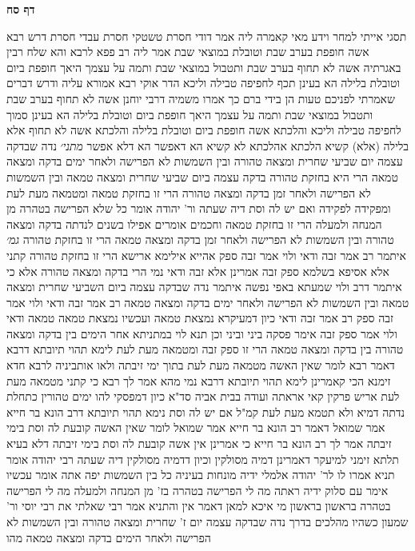 \documentclass[12pt, openany]{book}
\newcommand{\sethebfont}{
\fontsize{10.5pt}{21.0pt} \selectfont
}
\newcommand{\twocol}[1]{
	{\sethebfont \begin{multicols}{2}
			#1
	\end{multicols}}	
}
\newcommand{\sectname}{}
\newcommand{\newsection}[1]{
	\addcontentsline{toc}{section}{#1}
	\renewcommand{\sectname}{#1}	
	\vspace{-\baselineskip}
	\begin{center}
		\textbf{%
\fontsize{16pt}{16pt}\selectfont
			#1}
	\end{center}
	\vspace{-\baselineskip}
	\nopagebreak
}
\begin{document}
\newsection{דף סח}
\twocol{תסגי אייתי למחר  וידע מאי קאמרה ליה  אמר  דודי חסרת טשטקי חסרת עבדי חסרת 
דרש רבא  אשה חופפת בערב שבת וטובלת במוצאי שבת  אמר ליה רב פפא לרבא  והא שלח רבין באגרתיה אשה לא תחוף בערב שבת ותטבול במוצאי שבת 
ותמה על עצמך היאך חופפת ביום וטובלת בלילה הא בעינן תכף לחפיפה טבילה וליכא 
הדר אוקי רבא אמורא עליה ודרש  דברים שאמרתי לפניכם טעות הן בידי ברם כך אמרו משמיה דרבי יוחנן אשה לא תחוף בערב שבת ותטבול במוצאי שבת ותמה על עצמך היאך חופפת ביום וטובלת בלילה הא בעינן סמוך לחפיפה טבילה וליכא 
והלכתא  אשה חופפת ביום וטובלת בלילה  והלכתא  אשה לא תחוף אלא בלילה  (אלא) קשיא הלכתא אהלכתא 
לא קשיא הא דאפשר הא דלא אפשר
{\large\emph{מתני׳}} נדה שבדקה עצמה יום שביעי שחרית ומצאה טהורה ובין השמשות לא הפרישה ולאחר ימים בדקה ומצאה טמאה הרי היא בחזקת טהורה
בדקה עצמה ביום שביעי שחרית ומצאה טמאה ובין השמשות לא הפרישה ולאחר זמן בדקה ומצאה טהורה הרי זו בחזקת טמאה
ומטמאה מעת לעת ומפקידה לפקידה  ואם יש לה וסת דיה שעתה 
ור' יהודה אומר  כל שלא הפרישה בטהרה מן המנחה ולמעלה הרי זו בחזקת טמאה  וחכמים אומרים  אפילו בשנים לנדתה בדקה ומצאה טהורה ובין השמשות לא הפרישה ולאחר זמן בדקה ומצאה טמאה הרי זו בחזקת טהורה
{\large\emph{גמ׳}} איתמר רב אמר זבה ודאי ולוי אמר  זבה ספק 
אהייא  אילימא ארישא הרי זו בחזקת טהורה קתני 
אלא אסיפא  בשלמא ספק זבה אמרינן אלא זבה ודאי נמי  הרי בדקה ומצאה טהורה 
אלא כי איתמר דרב ולוי שמעתא באפי נפשה איתמר  נדה שבדקה עצמה ביום השביעי שחרית ומצאה טמאה ובין השמשות לא הפרישה ולאחר ימים בדקה ומצאה טמאה רב אמר זבה ודאי ולוי אמר זבה ספק 
רב אמר  זבה ודאי כיון דמעיקרא נמצאת טמאה ועכשיו נמצאת טמאה טמאה ודאי  ולוי אמר  ספק זבה אימר פסקה ביני וביני
וכן תנא לוי במתניתא  אחר הימים בין בדקה ומצאה טהורה בין בדקה ומצאה טמאה הרי זו ספק זבה
ומטמאה מעת לעת לימא תהוי תיובתא דרבא  דאמר רבא  לומר שאין האשה מטמאה מעת לעת בתוך ימי זיבתה 
ולאו אותביניה לרבא חדא זימנא  הכי קאמרינן  לימא תהוי תיובתא דרבא נמי מהא 
אמר לך רבא  כי קתני מטמאה מעת לעת אריש פרקין קאי אראתה ועודה בבית אביה 
סד"א כיון דמפסקי להו ימים טהורין כתחלת נדתה דמיא ולא תטמא מעת לעת קמ"ל
אם יש לה וסת נימא תהוי תיובתא דרב הונא בר חייא אמר שמואל דאמר רב הונא בר חייא אמר שמואל  לומר שאין האשה קובעת לה וסת בימי זיבתה 
אמר לך רב הונא בר חייא  כי אמרינן אין אשה קובעת לה וסת בימי זיבתה דלא בעיא תלתא זימני למיעקר  דאמרינן דמיה מסולקין וכיון דדמיה מסולקין דיה שעתה
רבי יהודה אומר תניא אמרו לו לר' יהודה  אלמלי ידיה מונחות בעיניה כל בין השמשות יפה אתה אומר
עכשיו אימר עם סלוק ידיה ראתה מה לי הפרישה בטהרה בז' מן המנחה ולמעלה מה לי הפרישה בטהרה בראשון 
בראשון מי איכא למאן דאמר 
אין והתניא אמר רבי  שאלתי את רבי יוסי ור' שמעון כשהיו מהלכים בדרך נדה שבדקה עצמה יום ז' שחרית ומצאה טהורה ובין השמשות לא הפרישה ולאחר הימים בדקה ומצאה טמאה מהו 
}
\end{document}
